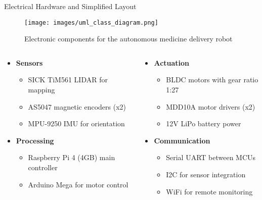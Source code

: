 \documentclass[aspectratio=169]{beamer}
\begin{document}
\begin{frame}{Electrical Hardware and Simplified Layout}
  \begin{figure}
    \centering
    \texttt{[image: images/uml\_class\_diagram.png]}
    \caption{Electronic components for the autonomous medicine delivery robot}
  \end{figure}
  
  \vspace{0.2cm}
  
  \begin{columns}
    \begin{column}{0.48\textwidth}
      \begin{itemize}
      \item \textbf{Sensors}
        \begin{itemize}
        \item SICK TiM561 LIDAR for mapping
        \item AS5047 magnetic encoders (x2)
        \item MPU-9250 IMU for orientation
        \end{itemize}
      \item \textbf{Processing}
        \begin{itemize}
        \item Raspberry Pi 4 (4GB) main controller
        \item Arduino Mega for motor control
        \end{itemize}
      \end{itemize}
    \end{column}
    \begin{column}{0.52\textwidth}
      \begin{itemize}
      \item \textbf{Actuation}
        \begin{itemize}
        \item BLDC motors with gear ratio 1:27
        \item MDD10A motor drivers (x2)
        \item 12V LiPo battery power
        \end{itemize}
      \item \textbf{Communication}
        \begin{itemize}
        \item Serial UART between MCUs
        \item I2C for sensor integration
        \item WiFi for remote monitoring
        \end{itemize}
      \end{itemize}
    \end{column}
  \end{columns}
\end{frame}
\end{document}
